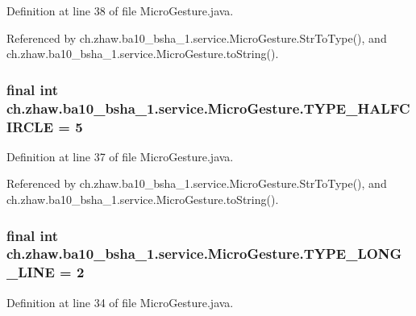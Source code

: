 Definition at line 38 of file MicroGesture.java.

Referenced by ch.zhaw.ba10\_\-bsha\_\-1.service.MicroGesture.StrToType(), and ch.zhaw.ba10\_\-bsha\_\-1.service.MicroGesture.toString().\hypertarget{classch_1_1zhaw_1_1ba10__bsha__1_1_1service_1_1MicroGesture_aa2babf7288fba5f44c2fd20f29f49386}{
\subsubsection[{TYPE\_\-HALFCIRCLE}]{\setlength{\rightskip}{0pt plus 5cm}final int {\bf ch.zhaw.ba10\_\-bsha\_\-1.service.MicroGesture.TYPE\_\-HALFCIRCLE} = 5}}
\label{classch_1_1zhaw_1_1ba10__bsha__1_1_1service_1_1MicroGesture_aa2babf7288fba5f44c2fd20f29f49386}


Definition at line 37 of file MicroGesture.java.

Referenced by ch.zhaw.ba10\_\-bsha\_\-1.service.MicroGesture.StrToType(), and ch.zhaw.ba10\_\-bsha\_\-1.service.MicroGesture.toString().\hypertarget{classch_1_1zhaw_1_1ba10__bsha__1_1_1service_1_1MicroGesture_a7aa282efbebb6c0ed0fcce9ad05f0769}{
\subsubsection[{TYPE\_\-LONG\_\-LINE}]{\setlength{\rightskip}{0pt plus 5cm}final int {\bf ch.zhaw.ba10\_\-bsha\_\-1.service.MicroGesture.TYPE\_\-LONG\_\-LINE} = 2}}
\label{classch_1_1zhaw_1_1ba10__bsha__1_1_1service_1_1MicroGesture_a7aa282efbebb6c0ed0fcce9ad05f0769}


Definition at line 34 of file MicroGesture.java.

